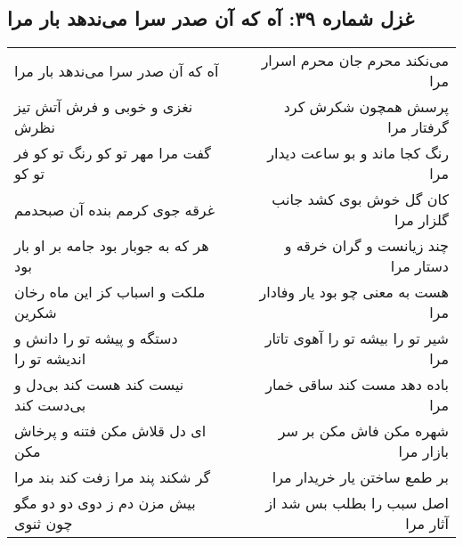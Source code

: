 \begin{center}
\section*{غزل شماره ۳۹: آه که آن صدر سرا می‌ندهد بار مرا}
\label{sec:0039}
\begin{longtable}{l p{0.5cm} r}
آه که آن صدر سرا می‌ندهد بار مرا
&&
می‌نکند محرم جان محرم اسرار مرا
\\
نغزی و خوبی و فرش آتش تیز نظرش
&&
پرسش همچون شکرش کرد گرفتار مرا
\\
گفت مرا مهر تو کو رنگ تو کو فر تو کو
&&
رنگ کجا ماند و بو ساعت دیدار مرا
\\
غرقه جوی کرمم بنده آن صبحدمم
&&
کان گل خوش بوی کشد جانب گلزار مرا
\\
هر که به جوبار بود جامه بر او بار بود
&&
چند زیانست و گران خرقه و دستار مرا
\\
ملکت و اسباب کز این ماه رخان شکرین
&&
هست به معنی چو بود یار وفادار مرا
\\
دستگه و پیشه تو را دانش و اندیشه تو را
&&
شیر تو را بیشه تو را آهوی تاتار مرا
\\
نیست کند هست کند بی‌دل و بی‌دست کند
&&
باده دهد مست کند ساقی خمار مرا
\\
ای دل قلاش مکن فتنه و پرخاش مکن
&&
شهره مکن فاش مکن بر سر بازار مرا
\\
گر شکند پند مرا زفت کند بند مرا
&&
بر طمع ساختن یار خریدار مرا
\\
بیش مزن دم ز دوی دو دو مگو چون ثنوی
&&
اصل سبب را بطلب بس شد از آثار مرا
\\
\end{longtable}
\end{center}
